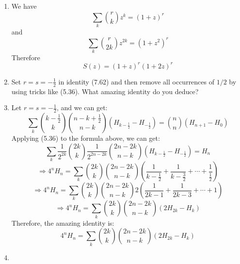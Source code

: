 \documentclass[12pt,a4paper]{article}
\makeatletter
\newtheorem*{solution}{Solution}
\theoremstyle{definition}
\renewenvironment{solution}[1][Solution] {\par\pushQED{\qed}\normalfont\topsep6\p@\@plus6\p@\relax\trivlist\item[\hskip\labelsep\bfseries#1\@addpunct{.}]\ignorespaces}{\popQED\endtrivlist\@endpefalse} \makeatother
\makeatother
\begin{document}
\begin{enumerate}
\begin{solution}
        	We have 
        	\begin{equation*}
        	    \sum_k \binom{r}{k}z^k=(1+z)^r
        	\end{equation*}
        	and
        	\begin{equation*}
        	    \sum_k \binom{r}{2k}z^{2k}=(1+z^2)^r
        	\end{equation*}
        	Therefore
        	\begin{equation*}
        	    S(z)=(1+z)^r(1+2z)^r
        	\end{equation*}
        \end{solution}
    \item 
        Set $r=s=-\frac{1}{2}$ in identity (7.62) and then remove all occurrences of $1/2$ by using tricks like (5.36). What amazing identity do you deduce?
        \begin{solution}
        	Let $r=s=-\frac{1}{2}$, and we can get:
        	\begin{equation*}
        		\sum_k \binom{k-\frac{1}{2}}{k}\binom{n-k+\frac{1}{2}}{n-k}(H_{k-\frac{1}{2}}-H_{-\frac{1}{2}})=\binom{n}{n}(H_{n+1}-H_{0})
        	\end{equation*}
        	Applying (5.36) to the formula above, we can get:
        	\begin{equation*}
        	    \sum_k \frac{1}{2^{2k}}\binom{2k}{k}\frac{1}{2^{2n-2k}}\binom{2n-2k}{n-k}(H_{k-\frac{1}{2}}-H_{-\frac{1}{2}})=H_n
        	\end{equation*}
        	\begin{equation*}
        	    \Rightarrow 4^nH_n=\sum_k\binom{2k}{k}\binom{2n-2k}{n-k}(\frac{1}{k-\frac{1}{2}}+\frac{1}{k-\frac{3}{2}}+\cdots+\frac{1}{\frac{1}{2}})
        	\end{equation*}
        	\begin{equation*}
        	    \Rightarrow 4^nH_n=\sum_k\binom{2k}{k}\binom{2n-2k}{n-k}2(\frac{1}{2k-1}+\frac{1}{2k-3}+\cdots+1)
        	\end{equation*}
        	\begin{equation*}
        	    \Rightarrow 4^nH_n=\sum_k\binom{2k}{k}\binom{2n-2k}{n-k}(2H_{2k}-H_k)
        	\end{equation*}
        	Therefore, the amazing identity is:
        	\begin{equation*}
        	    4^nH_n=\sum_k\binom{2k}{k}\binom{2n-2k}{n-k}(2H_{2k}-H_k)
        	\end{equation*}
        \end{solution}
    \item 

\end{enumerate}
\end{document}
